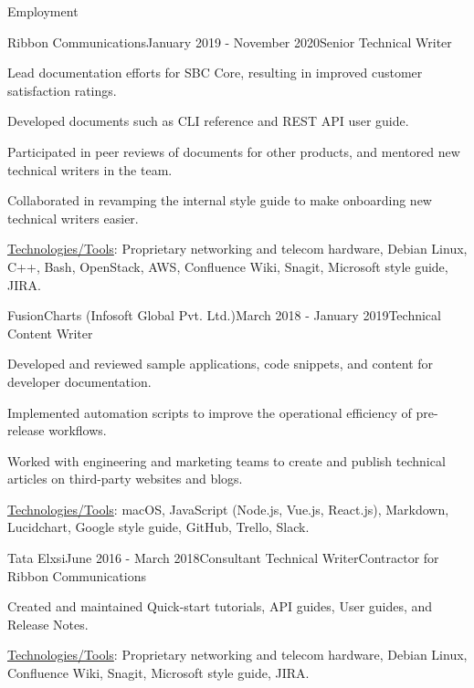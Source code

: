 \documentclass{resume} %
\begin{document}
\begin{rSection}{Employment}
\begin{rSubsection}{Ribbon Communications}{January 2019 - November 2020}{Senior Technical Writer}{}
\item Lead documentation efforts for SBC Core, resulting in improved customer satisfaction ratings.
\item Developed documents such as CLI reference and REST API user guide.
\item Participated in peer reviews of documents for other products, and mentored new technical writers in the team.
\item Collaborated in revamping the internal style guide to make onboarding new technical writers easier.
\item \underline{Technologies/Tools}: Proprietary networking and telecom hardware, Debian Linux, C++, Bash, OpenStack, AWS, Confluence Wiki, Snagit, Microsoft style guide, JIRA.
\end{rSubsection}



\begin{rSubsection}{FusionCharts (Infosoft Global Pvt. Ltd.)}{March 2018 - January 2019}{Technical Content Writer}{}
\item Developed and reviewed sample applications, code snippets, and content for developer documentation.
\item Implemented automation scripts to improve the operational efficiency of pre-release workflows.
\item Worked with engineering and marketing teams to create and publish technical articles on third-party websites and blogs.
\item \underline{Technologies/Tools}: macOS, JavaScript (Node.js, Vue.js, React.js), Markdown, Lucidchart, Google style guide, GitHub, Trello, Slack.
\end{rSubsection}


\begin{rSubsection}{Tata Elxsi}{June 2016 - March 2018}{Consultant Technical Writer}{Contractor for Ribbon Communications}
\item Created and maintained Quick-start tutorials, API guides, User guides, and Release Notes.
\item \underline{Technologies/Tools}: Proprietary networking and telecom hardware, Debian Linux, Confluence Wiki, Snagit, Microsoft style guide, JIRA.
\end{rSubsection}


\end{rSection}
\end{document}
